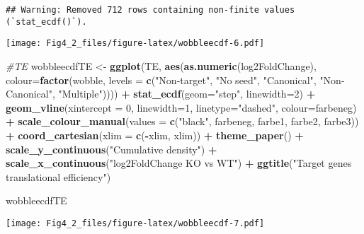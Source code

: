 \documentclass[
]{article}
\newenvironment{Shaded}{\begin{snugshade}}{\end{snugshade}}
\newcommand{\AttributeTok}[1]{\textcolor[rgb]{0.13,0.29,0.53}{#1}}
\newcommand{\CommentTok}[1]{\textcolor[rgb]{0.56,0.35,0.01}{\textit{#1}}}
\newcommand{\DecValTok}[1]{\textcolor[rgb]{0.00,0.00,0.81}{#1}}
\newcommand{\FunctionTok}[1]{\textcolor[rgb]{0.13,0.29,0.53}{\textbf{#1}}}
\newcommand{\NormalTok}[1]{#1}
\newcommand{\OtherTok}[1]{\textcolor[rgb]{0.56,0.35,0.01}{#1}}
\newcommand{\SpecialCharTok}[1]{\textcolor[rgb]{0.81,0.36,0.00}{\textbf{#1}}}
\newcommand{\StringTok}[1]{\textcolor[rgb]{0.31,0.60,0.02}{#1}}
\begin{document}
\begin{verbatim}
## Warning: Removed 712 rows containing non-finite values (`stat_ecdf()`).
\end{verbatim}

\texttt{[image: Fig4\_2\_files/figure-latex/wobbleecdf-6.pdf]}

\begin{Shaded}
\begin{Highlighting}[]
\CommentTok{\#TE}
\NormalTok{wobbleecdfTE }\OtherTok{\textless{}{-}} \FunctionTok{ggplot}\NormalTok{(TE, }\FunctionTok{aes}\NormalTok{(}\FunctionTok{as.numeric}\NormalTok{(log2FoldChange), }\AttributeTok{colour=}\FunctionTok{factor}\NormalTok{(wobble, }\AttributeTok{levels =} \FunctionTok{c}\NormalTok{(}\StringTok{"Non{-}target"}\NormalTok{, }\StringTok{"No seed"}\NormalTok{, }\StringTok{"Canonical"}\NormalTok{, }\StringTok{"Non{-}Canonical"}\NormalTok{, }\StringTok{"Multiple"}\NormalTok{)))) }\SpecialCharTok{+} 
  \FunctionTok{stat\_ecdf}\NormalTok{(}\AttributeTok{geom=}\StringTok{"step"}\NormalTok{, }\AttributeTok{linewidth=}\DecValTok{2}\NormalTok{) }\SpecialCharTok{+}
  \FunctionTok{geom\_vline}\NormalTok{(}\AttributeTok{xintercept =} \DecValTok{0}\NormalTok{, }\AttributeTok{linewidth=}\DecValTok{1}\NormalTok{, }\AttributeTok{linetype=}\StringTok{"dashed"}\NormalTok{, }\AttributeTok{colour=}\NormalTok{farbeneg) }\SpecialCharTok{+}
  \FunctionTok{scale\_colour\_manual}\NormalTok{(}\AttributeTok{values =} \FunctionTok{c}\NormalTok{(}\StringTok{"black"}\NormalTok{, farbeneg, farbe1, farbe2, farbe3)) }\SpecialCharTok{+}
  \FunctionTok{coord\_cartesian}\NormalTok{(}\AttributeTok{xlim =} \FunctionTok{c}\NormalTok{(}\SpecialCharTok{{-}}\NormalTok{xlim, xlim)) }\SpecialCharTok{+} 
  \FunctionTok{theme\_paper}\NormalTok{() }\SpecialCharTok{+}
  \FunctionTok{scale\_y\_continuous}\NormalTok{(}\StringTok{"Cumulative density"}\NormalTok{) }\SpecialCharTok{+} \FunctionTok{scale\_x\_continuous}\NormalTok{(}\StringTok{"log2FoldChange KO vs WT"}\NormalTok{) }\SpecialCharTok{+}
  \FunctionTok{ggtitle}\NormalTok{(}\StringTok{"Target genes translational efficiency"}\NormalTok{)}

\NormalTok{wobbleecdfTE}
\end{Highlighting}
\end{Shaded}

\texttt{[image: Fig4\_2\_files/figure-latex/wobbleecdf-7.pdf]}
\end{document}
